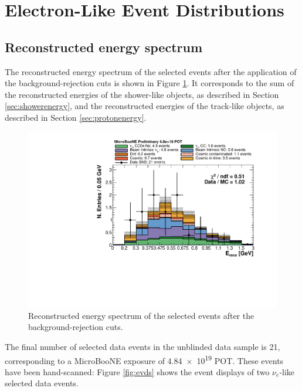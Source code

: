 
\section{Electron-Like Event Distributions}\label{sec:electron_like}
\subsection{Reconstructed energy spectrum}
The reconstructed energy spectrum of the selected events after the application of the background-rejection cuts is shown in Figure \ref{fig:spectrum_after}. It corresponds to the sum of the reconstructed energies of the shower-like objects, as described in Section \ref{sec:showerenergy}, and the reconstructed energies of the track-like objects, as described in Section \ref{sec:protonenergy}. 

\begin{figure}[htbp]
\centering
  \includegraphics[width=0.65\linewidth]{figures/h_fixed_energy_after.pdf}
    \caption{Reconstructed energy spectrum of the selected events after the background-rejection cuts.}\label{fig:spectrum_after}

\end{figure}

The final number of selected data events in the unblinded data sample is 21, corresponding to a MicroBooNE exposure of \num{4.84e19} POT. These events have been hand-scanned: Figure \ref{fig:evds} shows the event displays of two $\nu_{e}$-like selected data events.

